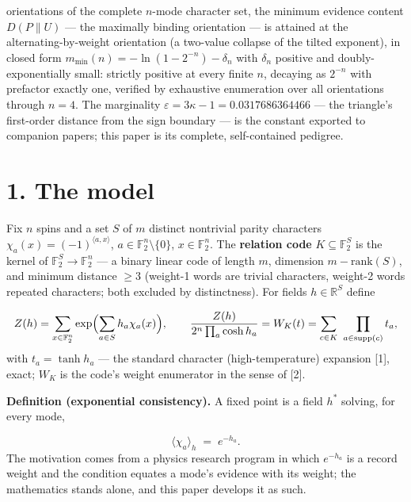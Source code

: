 \documentclass[11pt]{article}
\begin{document}
orientations of the complete $n$-mode character set, the minimum evidence content $D(P\|U)$ — the maximally binding orientation — is attained at the alternating-by-weight orientation (a two-value collapse of the tilted exponent), in closed form $m_{\min}(n) = -\ln(1-2^{-n}) - \delta_n$ with $\delta_n$ positive and doubly-exponentially small: strictly positive at every finite $n$, decaying as $2^{-n}$ with prefactor exactly one, verified by exhaustive enumeration over all orientations through $n=4$.  The marginality $\varepsilon = 3\kappa - 1 = 0.0317686364466$ — the triangle's first-order distance from the sign boundary — is the constant exported to companion papers; this paper is its complete, self-contained pedigree.

\section*{1. The model}
Fix $n$ spins and a set $S$ of $m$ distinct nontrivial parity characters $\chi_a(x) = (-1)^{\langle a, x\rangle}$, $a \in \mathbb F_2^n\setminus\{0\}$, $x \in \mathbb F_2^n$.  The \textbf{relation code} $K \subseteq \mathbb F_2^S$ is the kernel of $\mathbb F_2^S \to \mathbb F_2^n$ — a binary linear code of length $m$, dimension $m - \mathrm{rank}(S)$, and minimum distance $\ge 3$ (weight-1 words are trivial characters, weight-2 words repeated characters; both excluded by distinctness).  For fields $h \in \mathbb R^S$ define

\[
Z(h) = \sum_{x\in\mathbb F_2^n} \exp\Bigl(\sum_{a\in S} h_a
\chi_a(x)\Bigr), \qquad
\frac{Z(h)}{2^n\prod_a \cosh h_a} = W_K(t) =
\sum_{c\in K}\ \prod_{a\in\mathrm{supp}(c)} t_a,
\]
with $t_a = \tanh h_a$ — the standard character (high-temperature) expansion [1], exact; $W_K$ is the code's weight enumerator in the sense of [2].

\textbf{Definition (exponential consistency).}  A fixed point is a field $h^*$ solving, for every mode,

\[
\langle\chi_a\rangle_{h} \;=\; e^{-h_a}.
\]
The motivation comes from a physics research program in which $e^{-h_a}$ is a record weight and the condition equates a mode's evidence with its weight; the mathematics stands alone, and this paper develops it as such.
\end{document}
